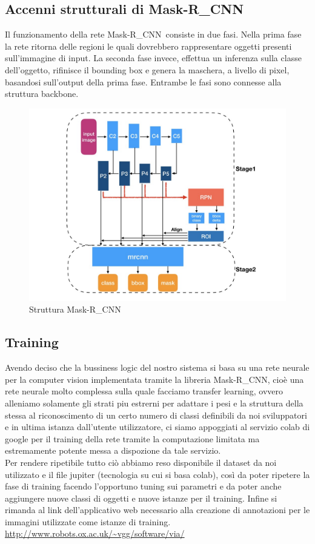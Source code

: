 \documentclass[12pt,a4paper]{article}
\newcommand{\mrcnn}{Mask-R\_CNN}
\begin{document}
\subsection{Accenni strutturali di \mrcnn}

Il funzionamento della rete \mrcnn\ consiste in due fasi. Nella prima
fase la rete ritorna delle regioni le quali dovrebbero rappresentare
oggetti presenti sull'immagine di input. La seconda fase invece,
effettua un inferenza sulla classe dell'oggetto, rifinisce il bounding
box e genera la maschera, a livello di pixel, basandosi sull'output
della prima fase. Entrambe le fasi sono connesse alla struttura
backbone.

\begin{figure}[H]
    \caption{Struttura \mrcnn}
    \centering
    \includegraphics[width=\textwidth,height=\textheight,keepaspectratio]{mask_description.jpeg}
\end{figure}

\subsection{Training}

Avendo deciso che la bussiness logic del nostro sistema si basa su una rete
neurale per la computer vision implementata tramite la libreria \mrcnn, cioè una
rete neurale molto complessa sulla quale facciamo transfer learning, ovvero
alleniamo solamente gli strati piu estrerni per adattare i pesi e la struttura
della stessa al riconoscimento di un certo numero di classi definibili da noi
sviluppatori e in ultima istanza dall'utente utilizzatore, ci siamo appoggiati
al servizio colab di google per il training della rete tramite la computazione
limitata ma estremamente potente messa a dispozione da tale servizio.\\ Per
rendere ripetibile tutto ciò abbiamo reso disponibile il dataset da noi
utilizzato e il file jupiter (tecnologia su cui si basa colab), così da poter
ripetere la fase di training facendo l'opportuno tuning sui parametri e da
poter anche aggiungere nuove classi di oggetti e nuove istanze per il training.
Infine si rimanda al link dell'applicativo web necessario alla creazione di
annotazioni per le immagini utilizzate come istanze di training.
\url{http://www.robots.ox.ac.uk/~vgg/software/via/}
\end{document}

